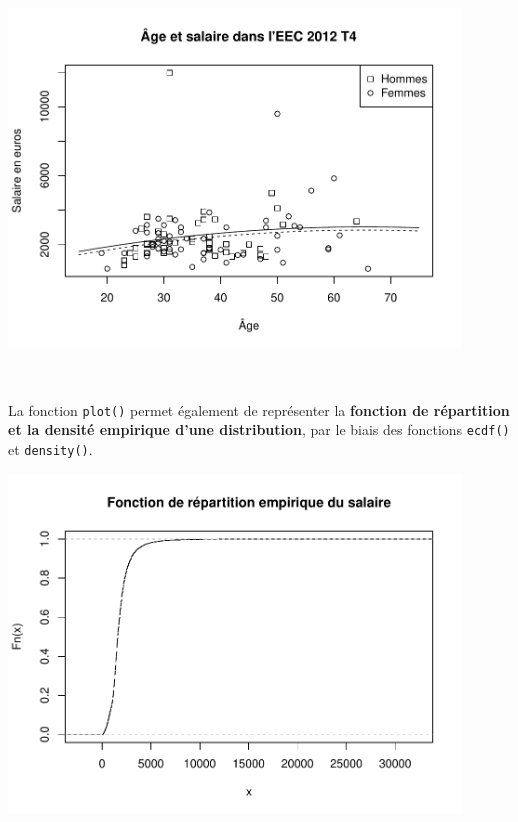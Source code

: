 \documentclass[12pt,twosided, notitlepage]{book}
\newenvironment{Shaded}{}{}
\newcommand{\CommentTok}[1]{\textcolor[rgb]{0.00,0.50,0.00}{#1}}
\newcommand{\DataTypeTok}[1]{#1}
\newcommand{\KeywordTok}[1]{\textcolor[rgb]{0.00,0.00,1.00}{#1}}
\newcommand{\NormalTok}[1]{#1}
\newcommand{\OperatorTok}[1]{#1}
\newcommand{\StringTok}[1]{\textcolor[rgb]{0.00,0.50,0.50}{#1}}
\renewenvironment{Shaded}{\begin{snugshade}}{\end{snugshade}}
\begin{document}
\begin{center}\includegraphics[width=12cm]{livret_files/figure-latex/unnamed-chunk-440-1} \end{center}

~

La fonction \texttt{plot()} permet également de
représenter la \textbf{fonction de répartition et la densité empirique
d'une distribution}, par le biais des fonctions
\texttt{ecdf()} et
\texttt{density()}.

\begin{Shaded}
\end{Shaded}

\begin{center}\includegraphics[width=12cm]{livret_files/figure-latex/unnamed-chunk-441-1} \end{center}
\end{document}
